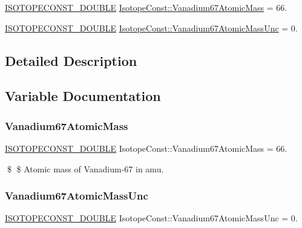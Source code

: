 \begin{DoxyCompactItemize}
\item 
\mbox{\hyperlink{group___isotope_const-_macros_ga8f45a7272ce02c0b4c65c44636ed719a}{I\+S\+O\+T\+O\+P\+E\+C\+O\+N\+S\+T\+\_\+\+D\+O\+U\+B\+LE}} \mbox{\hyperlink{group___isotope_const-_vanadium-_v67_ga4a42deb61505b8d2ea7f67f6f40e11db}{Isotope\+Const\+::\+Vanadium67\+Atomic\+Mass}} = 66.
\item 
\mbox{\hyperlink{group___isotope_const-_macros_ga8f45a7272ce02c0b4c65c44636ed719a}{I\+S\+O\+T\+O\+P\+E\+C\+O\+N\+S\+T\+\_\+\+D\+O\+U\+B\+LE}} \mbox{\hyperlink{group___isotope_const-_vanadium-_v67_ga5ce1bdfe4df4231f98e5fdc768814ac7}{Isotope\+Const\+::\+Vanadium67\+Atomic\+Mass\+Unc}} = 0.
\end{DoxyCompactItemize}


\subsection{Detailed Description}


\subsection{Variable Documentation}
\mbox{\label{group___isotope_const-_vanadium-_v67_ga4a42deb61505b8d2ea7f67f6f40e11db}} 
\subsubsection{\texorpdfstring{Vanadium67\+Atomic\+Mass}{Vanadium67AtomicMass}}
{\footnotesize\ttfamily \mbox{\hyperlink{group___isotope_const-_macros_ga8f45a7272ce02c0b4c65c44636ed719a}{I\+S\+O\+T\+O\+P\+E\+C\+O\+N\+S\+T\+\_\+\+D\+O\+U\+B\+LE}} Isotope\+Const\+::\+Vanadium67\+Atomic\+Mass = 66.}

\$ \$ Atomic mass of Vanadium-\/67 in amu. \mbox{\label{group___isotope_const-_vanadium-_v67_ga5ce1bdfe4df4231f98e5fdc768814ac7}} 
\subsubsection{\texorpdfstring{Vanadium67\+Atomic\+Mass\+Unc}{Vanadium67AtomicMassUnc}}
{\footnotesize\ttfamily \mbox{\hyperlink{group___isotope_const-_macros_ga8f45a7272ce02c0b4c65c44636ed719a}{I\+S\+O\+T\+O\+P\+E\+C\+O\+N\+S\+T\+\_\+\+D\+O\+U\+B\+LE}} Isotope\+Const\+::\+Vanadium67\+Atomic\+Mass\+Unc = 0.}

